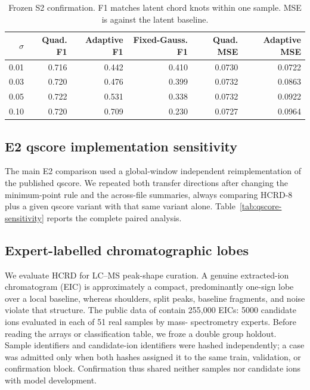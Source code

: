 \begin{table}[H]
\centering
\caption{Frozen S2 confirmation.  F1 matches latent chord knots within one
sample.  MSE is against the latent baseline.}
\label{tab:stable}
\begin{tabular}{rrrrrr}
\toprule
$\sigma$ & Quad. F1 & Adaptive F1 & Fixed-Gauss. F1 & Quad. MSE & Adaptive MSE \\
\midrule
0.01 & 0.716 & 0.442 & 0.410 & 0.0730 & 0.0722 \\
0.03 & 0.720 & 0.476 & 0.399 & 0.0732 & 0.0863 \\
0.05 & 0.722 & 0.531 & 0.338 & 0.0732 & 0.0922 \\
0.10 & 0.720 & 0.709 & 0.230 & 0.0727 & 0.0964 \\
\bottomrule
\end{tabular}
\end{table}


\subsection{E2 qscore implementation sensitivity}
The main E2 comparison used a global-window independent reimplementation of
the published qscore.  We repeated both transfer directions after changing
the minimum-point rule and the across-file summaries, always comparing HCRD-8
plus a given qscore variant with that same variant alone.  Table~\ref{tab:qscore-sensitivity}
reports the complete paired analysis.


\subsection{Expert-labelled chromatographic lobes}
We evaluate HCRD for LC--MS peak-shape curation. A genuine extracted-ion
chromatogram (EIC) is approximately a compact, predominantly one-sign lobe over
a local baseline, whereas shoulders, split peaks, baseline fragments, and noise
violate that structure.  The public data of \citet{muller2020eic} contain
255,000 EICs: 5000 candidate ions evaluated in each of 51 real samples by mass-
spectrometry experts.  Before reading the arrays or classification table, we
froze a double group holdout.  Sample identifiers and candidate-ion identifiers
were hashed independently; a case was admitted only when both hashes assigned
it to the same train, validation, or confirmation block.  Confirmation thus
shared neither samples nor candidate ions with model development.

